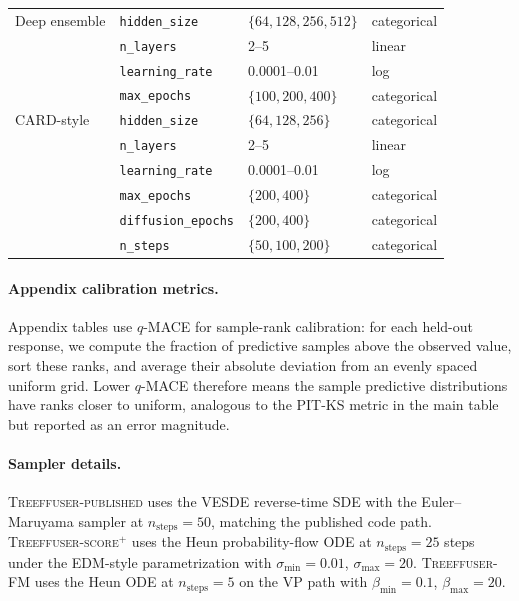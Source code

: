 \documentclass{tpm2026}
\begin{document}
\begin{table}[!h]
\begin{tabular}{llll}
    \midrule
    Deep ensemble & \texttt{hidden\_size}    & $\{64, 128, 256, 512\}$ & categorical \\
                  & \texttt{n\_layers}       & 2--5 & linear \\
                  & \texttt{learning\_rate}  & 0.0001--0.01 & log \\
                  & \texttt{max\_epochs}     & $\{100, 200, 400\}$ & categorical \\
    \midrule
    CARD-style  & \texttt{hidden\_size}      & $\{64, 128, 256\}$ & categorical \\
                & \texttt{n\_layers}         & 2--5 & linear \\
                & \texttt{learning\_rate}    & 0.0001--0.01 & log \\
                & \texttt{max\_epochs}       & $\{200, 400\}$ & categorical \\
                & \texttt{diffusion\_epochs} & $\{200, 400\}$ & categorical \\
                & \texttt{n\_steps}          & $\{50, 100, 200\}$ & categorical \\
    \bottomrule
  \end{tabular}
\end{table}

\paragraph{Appendix calibration metrics.} Appendix tables use $q$-MACE for sample-rank calibration: for each held-out response, we compute the fraction of predictive samples above the observed value, sort these ranks, and average their absolute deviation from an evenly spaced uniform grid. Lower $q$-MACE therefore means the sample predictive distributions have ranks closer to uniform, analogous to the PIT-KS metric in the main table but reported as an error magnitude.

\paragraph{Sampler details.}
\textsc{Treeffuser-published} uses the VESDE reverse-time SDE with the Euler--Maruyama sampler at $n_{\text{steps}}=50$, matching the published code path. \textsc{Treeffuser-score$^+$} uses the Heun probability-flow ODE at $n_{\text{steps}}=25$ steps under the EDM-style parametrization with $\sigma_{\min}=0.01$, $\sigma_{\max}=20$. \textsc{Treeffuser-FM} uses the Heun ODE at $n_{\text{steps}}=5$ on the VP path with $\beta_{\min}=0.1$, $\beta_{\max}=20$.
\end{document}
